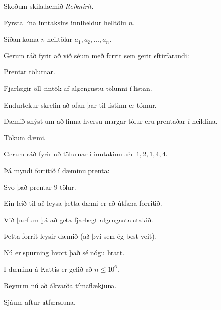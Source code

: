 {
	{
		\item<1-> Skoðum skiladæmið \emph{Reiknirit}.
		\item<2-> Fyrsta lína inntaksins inniheldur heiltölu $n$.
		\item<3-> Síðan koma $n$ heiltölur $a_1, a_2, \dots, a_n$.
		\item<4-> Gerum ráð fyrir að við séum með forrit sem gerir eftirfarandi:
		{
			\item<5-> Prentar tölurnar.
			\item<6-> Fjarlægir öll eintök af algengustu tölunni í listan.
			\item<7-> Endurtekur skrefin að ofan þar til listinn er tómur.
		}
		\item<8-> Dæmið snýst um að finna hversu margar tölur eru prentaðar í heildina.
		\item<9-> Tökum dæmi.
	}
}

{
	{
		\item<1-> Gerum ráð fyrir að tölurnar í inntakinu séu $1, 2, 1, 4, 4$.
		\item<2-> Þá myndi forritið í dæminu prenta:
		\item<3->[] 
		\item<4-> Svo það prentar $9$ tölur.
	}
}

{
	{
		\item<1-> Ein leið til að leysa þetta dæmi er að útfæra forritið.
		\item<2-> Við þurfum þá að geta fjarlægt algengasta stakið.
	}
}

{
}

{
	{
		\item<1-> Þetta forrit leysir dæmið (að því sem ég best veit).
		\item<2-> Nú er spurning hvort það sé nógu hratt.
		\item<3-> Í dæminu á Kattis er gefið að $n \leq 10^6$.
		\item<4-> Reynum nú að ákvarða tímaflækjuna.
		\item<5-> Sjáum aftur útfærsluna.
	}
}

{
}

